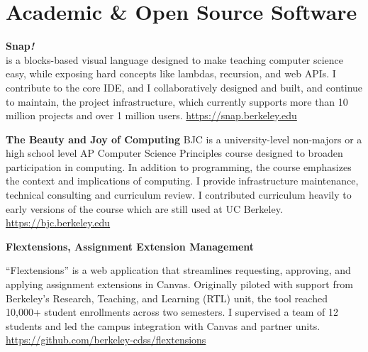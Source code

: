 \section{Academic \& Open Source Software}


\vspace{6pt}

\textbf{Snap\textit{!}}\\
\small \snap is a blocks-based visual language designed to make teaching computer science easy, while exposing hard concepts like lambdas, recursion, and web APIs. I contribute to the core IDE, and I collaboratively designed and built, and continue to maintain, the \snapcloud project infrastructure, which currently supports more than 10 million projects and over 1 million users.
\newline
\small{\href{https://snap.berkeley.edu}{https://snap.berkeley.edu}}

\vspace{12pt}

\textbf{The Beauty and Joy of Computing}
\newline
\small BJC is a university-level non-majors or a high school level AP Computer Science Principles course designed to broaden participation in computing. In addition to programming, the course emphasizes the context and implications of computing. I provide infrastructure maintenance, technical consulting and curriculum review. I contributed curriculum heavily to early versions of the course which are still used at UC Berkeley.
\newline
\small{\href{https://bjc.berkeley.edu}{https://bjc.berkeley.edu}}

\vspace{12pt}

\textbf{Flextensions, Assignment Extension Management}

\vspace{3pt}

\small{``Flextensions'' is a web application that streamlines requesting, approving, and applying assignment extensions in Canvas. Originally piloted with support from Berkeley's Research, Teaching, and Learning (RTL) unit, the tool reached 10,000+ student enrollments across two semesters. I supervised a team of 12 students and led the campus integration with Canvas and partner units.}
\linebreak
\small{\href{https://github.com/berkeley-cdss/flextensions}{https://github.com/berkeley-cdss/flextensions}}

